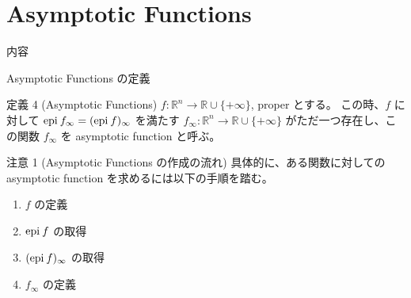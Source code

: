 \documentclass[aspectratio=169, dvipdfmx, 11pt]{beamer} %
\newcommand{\RealNumberSet}{\mathbb{R}}
\newcommand{\NDemenstionalRealEuclidianSpace}{\mathbb{R}^n}
\newcommand{\Epigraph}[1]{\text{epi\:${#1}$}} %
\begin{document}
\section{Asymptotic Functions}
\begin{frame}{内容}
  \tableofcontents[currentsection]
\end{frame}

\begin{frame}{Asymptotic Functions の定義}
  \begin{block}{定義 4 (Asymptotic Functions) \cite{ref1}}
    $f: \NDemenstionalRealEuclidianSpace \rightarrow \RealNumberSet \cup \{+\infty\}$, proper とする。
    この時、$f$ に対して $\Epigraph{f_{\infty}} = (\Epigraph{f})_{\infty}$ を満たす $f_{\infty}: \NDemenstionalRealEuclidianSpace \rightarrow \RealNumberSet \cup \{+\infty\}$ がただ一つ存在し、この関数 $f_{\infty}$ を asymptotic function と呼ぶ。
  \end{block}

  \pause
  \begin{alertblock}{注意 1 (Asymptotic Functions の作成の流れ)}
    具体的に、ある関数に対しての asymptotic function を求めるには以下の手順を踏む。
    \begin{enumerate}
      \item $f$ の定義
      \item $\Epigraph{f}$ の取得
      \item $(\Epigraph{f})_{\infty}$ の取得
      \item $f_{\infty}$ の定義
    \end{enumerate}
  \end{alertblock}
\end{frame}
\end{document}
